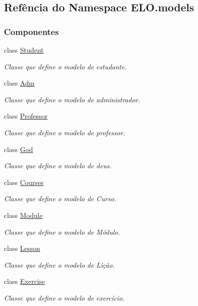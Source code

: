 \hypertarget{namespaceELO_1_1models}{\subsection{Refência do Namespace E\-L\-O.\-models}
\label{namespaceELO_1_1models}
}
\subsubsection*{Componentes}
\begin{DoxyCompactItemize}
\item 
class \hyperlink{classELO_1_1models_1_1Student}{Student}
\begin{DoxyCompactList}\small\item\em Classe que define o modelo de estudante. \end{DoxyCompactList}\item 
class \hyperlink{classELO_1_1models_1_1Adm}{Adm}
\begin{DoxyCompactList}\small\item\em Classe que define o modelo de administrador. \end{DoxyCompactList}\item 
class \hyperlink{classELO_1_1models_1_1Professor}{Professor}
\begin{DoxyCompactList}\small\item\em Classe que define o modelo de professor. \end{DoxyCompactList}\item 
class \hyperlink{classELO_1_1models_1_1God}{God}
\begin{DoxyCompactList}\small\item\em Classe que define o modelo de deus. \end{DoxyCompactList}\item 
class \hyperlink{classELO_1_1models_1_1Courses}{Courses}
\begin{DoxyCompactList}\small\item\em Classe que define o modelo de Curso. \end{DoxyCompactList}\item 
class \hyperlink{classELO_1_1models_1_1Module}{Module}
\begin{DoxyCompactList}\small\item\em Classe que define o modelo de Módulo. \end{DoxyCompactList}\item 
class \hyperlink{classELO_1_1models_1_1Lesson}{Lesson}
\begin{DoxyCompactList}\small\item\em Classe que define o modelo de Lição. \end{DoxyCompactList}\item 
class \hyperlink{classELO_1_1models_1_1Exercise}{Exercise}
\begin{DoxyCompactList}\small\item\em Classe que define o modelo de exercício. \end{DoxyCompactList}\end{DoxyCompactItemize}
